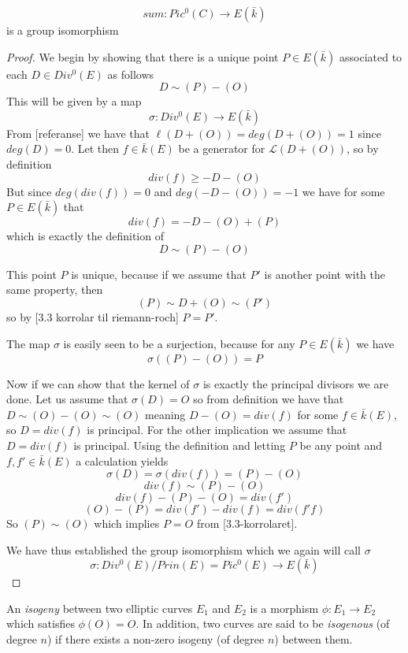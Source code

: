 \begin{thm}
 $$ sum: Pic^0(C) \rightarrow E(\bar{k}) $$
is a group isomorphism
\end{thm}
\begin{proof}
 We begin by showing that there is a unique point $P \in E(\bar{k})$ associated to
each $D \in Div^0(E)$ as follows
$$ D \sim (P) -(O) $$
This will be given by a map
$$ \sigma: Div^0(E) \rightarrow E(\bar{k}) $$
From [referanse] we have that $\ell(D+(O)) = deg(D+(O)) = 1$ since $deg(D) = 0$.
Let then $f \in \bar{k}(E)$ be a generator for $\mathscr{L}(D+(O))$, so by definition
$$ div(f) \geq -D-(O) $$
But since $deg(div(f)) = 0$ and $deg(-D-(O)) = -1$ we have for some $P \in E(\bar{k})$ that
$$ div(f) = -D-(O)+(P) $$
which is exactly the definition of
$$ D \sim (P) - (O) $$

This point $P$ is unique, because if we assume that $P'$ is another point with the same
property, then
$$ (P) \sim D + (O) \sim (P') $$
so by [3.3 korrolar til riemann-roch]
$ P = P'$.

The map $\sigma$ is easily seen to be a surjection, because for any $P \in E(\bar{k})$ we have
$$ \sigma((P)-(O)) = P $$

Now if we can show that the kernel of $\sigma$ is exactly the principal divisors we are done.
Let us assume that $\sigma(D) = O$ so from definition we have that $D \sim (O)-(O) \sim (O)$
meaning $D - (O) = div(f)$ for some $f \in \bar{k}(E)$, so $D = div(f)$ is principal.
For the other implication we assume that $D = div(f)$ is principal. Using the definition and
letting $P$ be any point and $f, f' \in \bar{k}(E)$ a calculation yields
$$ \sigma(D) = \sigma(div(f)) = (P)-(O) $$
$$ div(f) \sim (P) - (O) $$
$$ div(f) - (P) - (O) = div(f') $$
$$ (O) - (P) = div(f') - div(f) = div(f' f) $$
So $ (P) \sim (O) $ which implies $P = O$ from [3.3-korrolaret].

We have thus established the group isomorphism which we again will call $\sigma$
$$ \sigma : Div^0(E)/Prin(E) = Pic^0(E) \rightarrow E(\bar{k}) $$

\end{proof}

\begin{mydef}
 An \emph{isogeny} between two elliptic curves $E_1$ and $E_2$ is a morphism $\phi: E_1 \rightarrow E_2$
which satisfies $\phi(O) = O$. In addition, two curves are said to be \emph{isogenous} (of degree $n$) 
if there exists a non-zero isogeny (of degree $n$) between them.
\end{mydef}

